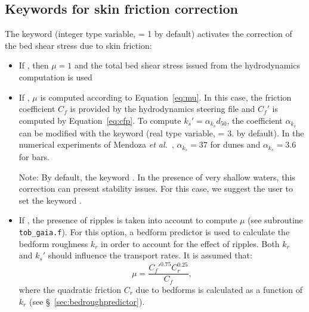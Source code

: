 \subsection{Keywords for skin friction correction}
The keyword  (integer type variable, {\ttfamily = 1} by default) activates the correction of the bed shear stress due to skin friction:
\begin{itemize}
\item If , then $\mu=1$ and the total bed shear stress issued from the hydrodynamics computation is used
\item If , $\mu$ is computed according to Equation~\ref{eq:mu}. In this case, the friction coefficient $C_f$ is provided by the hydrodynamics steering file and $C_f'$ is computed by Equation~\ref{eq:cfp}. To compute $k_s'=\alpha_{k_s} d_{50}$, the coefficient $\alpha_{k_s}$ can be modified with the keyword  (real type variable, {\ttfamily = 3.} by default). In the numerical experiments of Mendoza \textit{et al.}~\cite{Mendoza15}, $\alpha_{k_s}=37$ for dunes and $\alpha_{k_s}=3.6$ for bars.

 \begin{WarningBlock}{Note:}
  By default, the keyword . In the presence of very shallow waters, this correction can present stability issues. For this case, we suggest the user to set the keyword .
  \end{WarningBlock}

\item If , the presence of ripples is taken into account to compute $\mu$ (see subroutine \texttt{tob\_gaia.f}). For this option, a bedform predictor is used to calculate the bedform roughness $k_r$ in order to account for the effect of ripples. Both $k_r$
and $k_s'$ should influence the transport rates. It is assumed that:
\begin{equation}\label{eq:mu2}
\mu =\frac{C_f'^{0.75} C_r^{0.25}}{C_f},
\end{equation}
where the quadratic friction $C_r$ due to bedforms is calculated as a
function of $k_r$ (see \S~\ref{sec:bedroughpredictor}).
\end{itemize}

